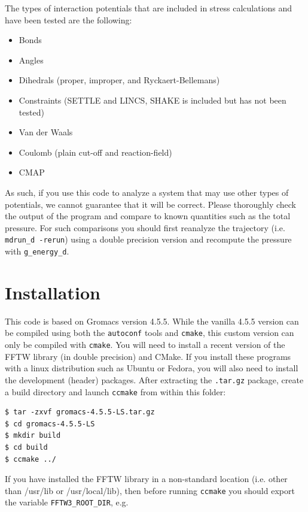 \documentclass[10pt,letterpaper,notitlepage]{article}
\begin{document}
The types of interaction potentials that are included in stress calculations and have been tested are the following:

\begin{itemize}
\item Bonds
\item Angles
\item Dihedrals (proper, improper, and Ryckaert-Bellemans)
\item Constraints (SETTLE and LINCS, SHAKE is included but has not been tested)
\item Van der Waals
\item Coulomb (plain cut-off and reaction-field) 
\item CMAP
\end{itemize}

As such, if you use this code to analyze a system that may use other types of potentials, we cannot guarantee that it will be correct. Please thoroughly check the output of the program and compare to known quantities such as the total pressure. For such comparisons you should first reanalyze the trajectory (i.e. \texttt{mdrun\_d -rerun}) using a double precision version and recompute the pressure with \texttt{g\_energy\_d}.

\section{Installation}

This code is based on Gromacs version 4.5.5. While the vanilla 4.5.5 version can be compiled using both the \texttt{autoconf} tools and \texttt{cmake}, this custom version can only be compiled with \texttt{cmake}. You will need to install a recent version of the FFTW library (in double precision) and CMake. If you install these programs with a linux distribution such as Ubuntu or Fedora, you will also need to install the development (header) packages. After extracting the \texttt{.tar.gz} package, create a build directory and launch \texttt{ccmake} from within this folder:
\begin{lstlisting}[caption=Basic compilation instructions with CMake]
$ tar -zxvf gromacs-4.5.5-LS.tar.gz
$ cd gromacs-4.5.5-LS
$ mkdir build
$ cd build
$ ccmake ../
\end{lstlisting}
If you have installed the FFTW library in a non-standard location (i.e. other than /usr/lib or /usr/local/lib), then before running \texttt{ccmake} you should export the variable \texttt{FFTW3\_ROOT\_DIR}, e.g. 
\end{document}
